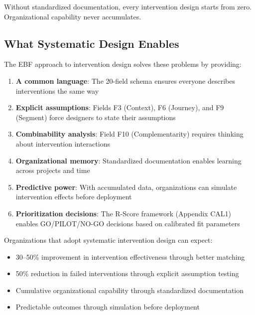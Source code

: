 Without standardized documentation, every intervention design starts from zero. Organizational capability never accumulates.

\subsection{What Systematic Design Enables}

The EBF approach to intervention design solves these problems by providing:

\begin{enumerate}
\item \textbf{A common language}: The 20-field schema ensures everyone describes interventions the same way
\item \textbf{Explicit assumptions}: Fields F3 (Context), F6 (Journey), and F9 (Segment) force designers to state their assumptions
\item \textbf{Combinability analysis}: Field F10 (Complementarity) requires thinking about intervention interactions
\item \textbf{Organizational memory}: Standardized documentation enables learning across projects and time
\item \textbf{Predictive power}: With accumulated data, organizations can simulate intervention effects before deployment
\item \textbf{Prioritization decisions}: The R-Score framework (Appendix CAL1) enables GO/PILOT/NO-GO decisions based on calibrated fit parameters
\end{enumerate}

\begin{tcolorbox}[colback=blue!5!white, colframe=blue!75!black,
    title=The Promise of Systematic Design]
Organizations that adopt systematic intervention design can expect:
\begin{itemize}[nosep]
\item 30--50\% improvement in intervention effectiveness through better matching
\item 50\% reduction in failed interventions through explicit assumption testing
\item Cumulative organizational capability through standardized documentation
\item Predictable outcomes through simulation before deployment
\end{itemize}
\end{tcolorbox}



